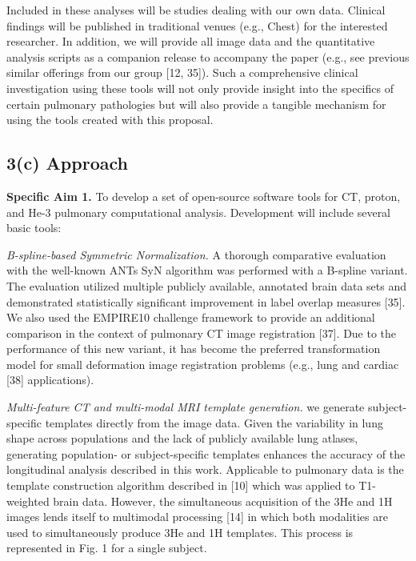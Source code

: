 \documentclass[11pt,]{article}
\begin{document}
Included in these analyses will be studies dealing with our own data.
Clinical findings will be published in traditional venues (e.g., Chest)
for the interested researcher. In addition, we will provide all image
data and the quantitative analysis scripts as a companion release to
accompany the paper (e.g., see previous similar offerings from our group
{[}12, 35{]}). Such a comprehensive clinical investigation using these
tools will not only provide insight into the specifics of certain
pulmonary pathologies but will also provide a tangible mechanism for
using the tools created with this proposal.

\subsection{\textbf{3(c) Approach}}\label{c-approach}

\textbf{Specific Aim 1.} To develop a set of open-source software tools
for CT, proton, and He-3 pulmonary computational analysis. Development
will include several basic tools:

\emph{B-spline-based Symmetric Normalization.} A thorough comparative
evaluation with the well-known ANTs SyN algorithm was performed with a
B-spline variant. The evaluation utilized multiple publicly available,
annotated brain data sets and demonstrated statistically significant
improvement in label overlap measures {[}35{]}. We also used the
EMPIRE10 challenge framework to provide an additional comparison in the
context of pulmonary CT image registration {[}37{]}. Due to the
performance of this new variant, it has become the preferred
transformation model for small deformation image registration problems
(e.g., lung and cardiac {[}38{]} applications).

\emph{Multi-feature CT and multi-modal MRI template generation.} we
generate subject-specific templates directly from the image data. Given
the variability in lung shape across populations and the lack of
publicly available lung atlases, generating population- or
subject-specific templates enhances the accuracy of the longitudinal
analysis described in this work. Applicable to pulmonary data is the
template construction algorithm described in {[}10{]} which was applied
to T1-weighted brain data. However, the simultaneous acquisition of the
3He and 1H images lends itself to multimodal processing {[}14{]} in
which both modalities are used to simultaneously produce 3He and 1H
templates. This process is represented in Fig. 1 for a single subject.
\end{document}
